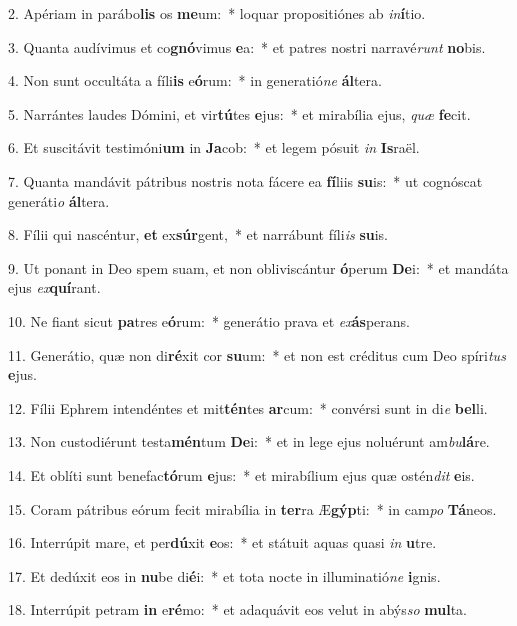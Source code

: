 2. Apériam in parábo\textbf{lis} os \textbf{me}um:~*  loquar propositiónes ab \textit{in}\textbf{í}tio.\

3. Quanta audívimus et co\textbf{gnó}vimus \textbf{e}a:~*  et patres nostri narravé\textit{runt} \textbf{no}bis.\

4. Non sunt occultáta a fíli\textbf{is} e\textbf{ó}rum:~*  in generatió\textit{ne} \textbf{ál}tera.\

5. Narrántes laudes Dómini, et vir\textbf{tú}tes \textbf{e}jus:~*  et mirabília ejus, \textit{quæ} \textbf{fe}cit.\

6. Et suscitávit testimóni\textbf{um} in \textbf{Ja}cob:~*  et legem pósuit \textit{in} \textbf{Is}raël.\

7. Quanta mandávit pátribus nostris nota fácere ea \textbf{fí}liis \textbf{su}is:~*  ut cognóscat generáti\textit{o} \textbf{ál}tera.\

8. Fílii qui nascéntur, \textbf{et} ex\textbf{súr}gent,~*  et narrábunt fíli\textit{is} \textbf{su}is.\

9. Ut ponant in Deo spem suam, et non obliviscántur \textbf{ó}perum \textbf{De}i:~*  et mandáta ejus \textit{ex}\textbf{quí}rant.\

10. Ne fiant sicut \textbf{pa}tres e\textbf{ó}rum:~*  generátio prava et \textit{ex}\textbf{ás}perans.\

11. Generátio, quæ non di\textbf{ré}xit cor \textbf{su}um:~*  et non est créditus cum Deo spíri\textit{tus} \textbf{e}jus.\

12. Fílii Ephrem intendéntes et mit\textbf{tén}tes \textbf{ar}cum:~*  convérsi sunt in di\textit{e} \textbf{bel}li.\

13. Non custodiérunt testa\textbf{mén}tum \textbf{De}i:~*  et in lege ejus noluérunt am\textit{bu}\textbf{lá}re.\

14. Et oblíti sunt benefac\textbf{tó}rum \textbf{e}jus:~*  et mirabílium ejus quæ ostén\textit{dit} \textbf{e}is.\

15. Coram pátribus eórum fecit mirabília in \textbf{ter}ra Æ\textbf{gýp}ti:~*  in cam\textit{po} \textbf{Tá}neos.\

16. Interrúpit mare, et per\textbf{dú}xit \textbf{e}os:~*  et státuit aquas quasi \textit{in} \textbf{u}tre.\

17. Et dedúxit eos in \textbf{nu}be di\textbf{é}i:~*  et tota nocte in illuminatió\textit{ne} \textbf{i}gnis.\

18. Interrúpit petram \textbf{in} e\textbf{ré}mo:~*  et adaquávit eos velut in abýs\textit{so} \textbf{mul}ta.\

